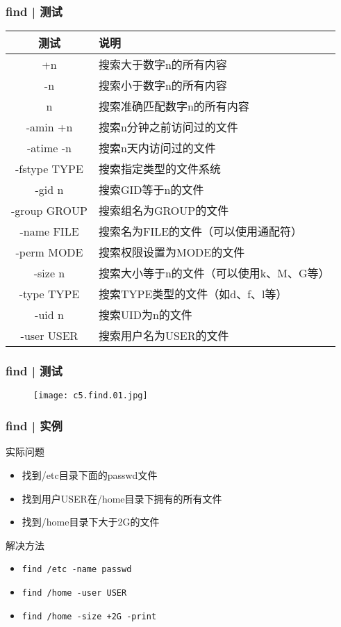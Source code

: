 \begin{frame}
  \frametitle{find | \alert{测试}}
  \begin{table}
    \centering
    \begin{tabularx}{0.9\textwidth}{cX}
      \hline
      \rowcolor{blue!50}测试 & 说明\\
      \hline
      +n & 搜索大于数字n的所有内容\\
      -n & 搜索小于数字n的所有内容\\
      n & 搜索准确匹配数字n的所有内容\\
      -amin +n & 搜索n分钟之前访问过的文件\\
      -atime -n & 搜索n天内访问过的文件\\
      -fstype TYPE & 搜索指定类型的文件系统\\
      -gid n & 搜索GID等于n的文件\\
      -group GROUP & 搜索组名为GROUP的文件\\
      -name FILE & 搜索名为FILE的文件（可以使用通配符）\\
      -perm MODE & 搜索权限设置为MODE的文件\\
      -size n & \small{搜索大小等于n的文件（可以使用k、M、G等）}\\
      -type TYPE & 搜索TYPE类型的文件（如d、f、l等）\\
      -uid n & 搜索UID为n的文件\\
      -user USER & 搜索用户名为USER的文件\\
      \hline
    \end{tabularx}
  \end{table}
\end{frame}

\begin{frame}
  \frametitle{find | 测试}
  \begin{figure}
    \centering
    \texttt{[image: c5.find.01.jpg]}
  \end{figure}
\end{frame}

\begin{frame}[fragile]
  \frametitle{find | \alert{实例}}
  \begin{block}{实际问题}
    \begin{itemize}
      \item<2-> 找到/etc目录下面的passwd文件
      \item<4-> 找到用户USER在/home目录下拥有的所有文件
      \item<6-> 找到/home目录下大于2G的文件
    \end{itemize}
  \end{block}
  \begin{block}{解决方法}
    \begin{itemize}
      \item<3-> \verb|find /etc -name passwd|
      \item<5-> \verb|find /home -user USER|
      \item<7-> \verb|find /home -size +2G -print|
    \end{itemize}
  \end{block}
\end{frame}

